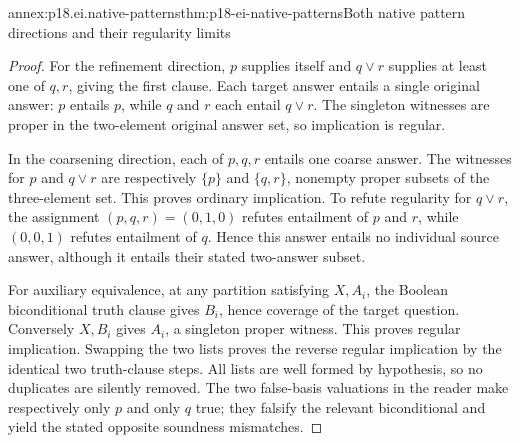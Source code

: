 \begin{annexitem}{annex:p18.ei.native-patterns}{thm:p18-ei-native-patterns}{Both native pattern directions and their regularity limits}
\begin{proof}
For the refinement direction, \(p\) supplies itself and \(q\lor r\)
supplies at least one of \(q,r\), giving the first clause. Each target
answer entails a single original answer: \(p\) entails \(p\), while
\(q\) and \(r\) each entail \(q\lor r\). The singleton witnesses
are proper in the two-element original answer set, so implication is regular.

In the coarsening direction, each of \(p,q,r\) entails one coarse answer.
The witnesses for \(p\) and \(q\lor r\) are respectively \(\{p\}\)
and \(\{q,r\}\), nonempty proper subsets of the three-element set.
This proves ordinary implication. To refute regularity for \(q\lor r\),
the assignment \((p,q,r)=(0,1,0)\) refutes entailment of \(p\) and
\(r\), while \((0,0,1)\) refutes entailment of \(q\). Hence this
answer entails no individual source answer, although it entails their stated
two-answer subset.

For auxiliary equivalence, at any partition satisfying \(X,A_i\), the
Boolean biconditional truth clause gives \(B_i\), hence coverage of the
target question. Conversely \(X,B_i\) gives \(A_i\), a singleton proper
witness. This proves regular implication. Swapping the two lists proves
the reverse regular implication by the identical two truth-clause steps.
All lists are well formed by hypothesis, so no duplicates are silently
removed. The two false-basis valuations in the reader make respectively
only \(p\) and only \(q\) true; they falsify the relevant biconditional
and yield the stated opposite soundness mismatches.
\end{proof}
\end{annexitem}

